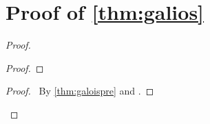 \section{Proof of \autoref{thm:galios}}\label{sec:galois}

\galois

\begin{proof}
    \pf\
    \qedstep
    \begin{proof}
        \step{}

    \end{proof}
    \begin{proof}
        \pf\ By \autoref{thm:galoispre} and .
    \end{proof}
\end{proof}
